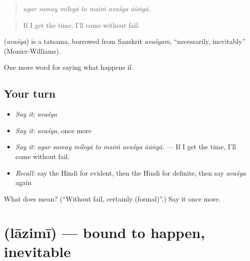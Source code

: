 \begin{quote}
      
\end{quote}

\begin{quote}
\emph{agar samay milegā to maiṁ avaśya āūṅgā.}
\end{quote}

\begin{quote}
If I get the time, I'll come without fail.
\end{quote}

\begin{cousinweb}
\textbf{} (\emph{avaśya}) is a tatsama, borrowed from Sanskrit \emph{avaśyam}, \textquotedblleft{}necessarily, inevitably\textquotedblright{} (Monier-Williams).
\end{cousinweb}

\begin{grammarlens}[title={What you've built}]
One more word for saying what happens if.
\end{grammarlens}

\subsection*{Your turn}
\begin{itemize}
\raggedright
  \item \emph{Say it:} \emph{avaśya}
  \item \emph{Say it:} \emph{avaśya}, once more
  \item \emph{Say it:} \emph{agar samay milegā to maiṁ avaśya āūṅgā.} — If I get the time, I'll come without fail.
  \item \emph{Recall:} say the Hindi for evident, then the Hindi for definite, then say \emph{avaśya} again
\end{itemize}

\begin{tcolorbox}[breakable,colback=teal!4,colframe=teal!35!black,title={Before you move on}]
What does  mean? (\textquotedblleft{}Without fail, certainly (formal)\textquotedblright{}.) Say it once more.
\end{tcolorbox}
\section[\texorpdfstring{\hi{लाज़िमी} (lāzimī)}{लाज़िमी (lāzimī)}]{ (lāzimī) — bound to happen, inevitable}

